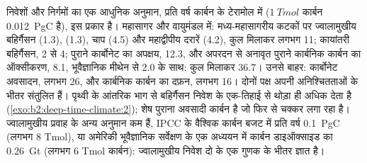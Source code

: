 निवेशों और निर्गमों का एक आधुनिक अनुमान, प्रति वर्ष कार्बन के टेरामोल में ($\qty{1}{Tmol}$
कार्बन \qty{0.012}{PgC} है), इस प्रकार है। महासागर और वायुमंडल में: मध्य-महासागरीय कटकों पर
ज्वालामुखीय बहिर्गैसन (1.3),  (1.3), चाप (4.5) और महाद्वीपीय दरारें (4.2), कुल मिलाकर लगभग 11;
कायांतरी बहिर्गैसन, 2 से 4; पुराने कार्बोनेट का अपक्षय, 12.3, और अपरदन से अनावृत
पुराने कार्बनिक कार्बन का ऑक्सीकरण, 8.1, भूवैज्ञानिक मीथेन से 2.0 के साथ: कुल मिलाकर \num{36.7}।
उनसे बाहर: कार्बोनेट अवसादन, लगभग 26, और कार्बनिक कार्बन का दफ़न, लगभग 16। दोनों
पक्ष अपनी अनिश्चितताओं के भीतर संतुलित हैं। पृथ्वी के आंतरिक भाग से बहिर्गैसन निवेश के एक-तिहाई से
थोड़ा ही अधिक देता है (\cref{exo:b2:deep-time-climate:2}); शेष पुराना अवसादी कार्बन है जो फिर से
चक्कर लगा रहा है। ज्वालामुखीय प्रवाह के अन्य अनुमान कम हैं, IPCC के वैश्विक कार्बन बजट में
प्रति वर्ष \qty{0.1}{PgC} (लगभग 8 \unit{Tmol}), या अमेरिकी भूवैज्ञानिक सर्वेक्षण के एक अध्ययन में कार्बन
डाइऑक्साइड का \qty{0.26}{Gt} (लगभग 6 \unit{Tmol} कार्बन): ज्वालामुखीय निवेश दो के एक गुणक के भीतर
ज्ञात है।

